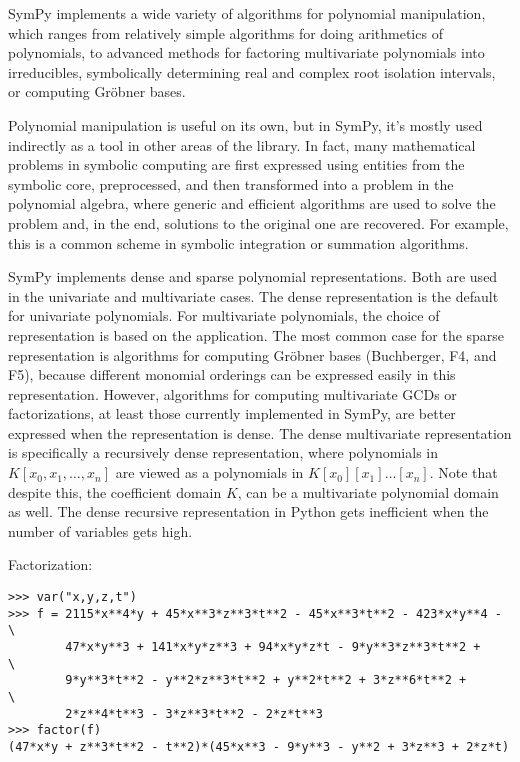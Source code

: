 
SymPy implements a wide variety of algorithms for polynomial manipulation,
which ranges from relatively simple algorithms for doing arithmetics of
polynomials, to advanced methods for factoring multivariate polynomials
into irreducibles, symbolically determining real and complex root isolation
intervals, or computing Gröbner bases.

Polynomial manipulation is useful on its own, but in SymPy, it's mostly used
indirectly as a tool in other areas of the library. In fact, many mathematical
problems in symbolic computing are first expressed using entities from the
symbolic core, preprocessed, and then transformed into a problem in the
polynomial algebra, where generic and efficient algorithms are used to solve
the problem and, in the end, solutions to the original one are recovered. For
example, this is a common scheme in symbolic integration or summation
algorithms.

SymPy implements dense and sparse polynomial representations. Both are used in
the univariate and multivariate cases. The dense representation is the default
for univariate polynomials. For multivariate polynomials, the choice of
representation is based on the application. The most common case for the sparse
representation is algorithms for computing Gröbner bases (Buchberger, F4, and
F5),
because different monomial orderings can be expressed easily in this
representation. However, algorithms for computing multivariate GCDs or
factorizations, at least those currently implemented in SymPy,
are better expressed when the representation is dense. The dense multivariate
representation is specifically a recursively dense representation, where
polynomials in $K[x_0, x_1,\dots, x_n]$ are viewed as a polynomials in
$K[x_0][x_1]\ldots[x_n]$. Note that despite this, the coefficient domain $K$,
can be a multivariate polynomial domain as well. The dense recursive
representation in Python gets inefficient when the number of variables gets
high.


\noindent Factorization:
\begin{verbatim}
>>> var("x,y,z,t")
>>> f = 2115*x**4*y + 45*x**3*z**3*t**2 - 45*x**3*t**2 - 423*x*y**4 - \
        47*x*y**3 + 141*x*y*z**3 + 94*x*y*z*t - 9*y**3*z**3*t**2 +    \
        9*y**3*t**2 - y**2*z**3*t**2 + y**2*t**2 + 3*z**6*t**2 +      \
        2*z**4*t**3 - 3*z**3*t**2 - 2*z*t**3
>>> factor(f)
(47*x*y + z**3*t**2 - t**2)*(45*x**3 - 9*y**3 - y**2 + 3*z**3 + 2*z*t)
\end{verbatim}


